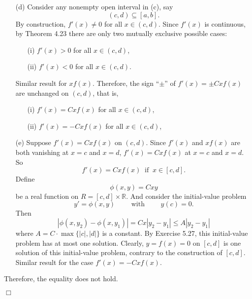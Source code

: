 \documentclass{article}
\begin{document}
\begin{enumerate}
\begin{enumerate}
  \item[(d)]
    Consider any nonempty open interval in (c), say
    \[
      (c,d) \subseteq [a,b].
    \]
    By construction, $f'(x) \neq 0$ for all $x \in (c,d)$.
    Since $f'(x)$ is continuous, by Theorem 4.23
    there are only two mutually exclusive possible cases:
    \begin{enumerate}
      \item[(i)]
      $f'(x) > 0$ for all $x \in (c,d)$,

      \item[(ii)]
      $f'(x) < 0$ for all $x \in (c,d)$.
    \end{enumerate}
    Similar result for $xf(x)$.
    Therefore, the sign ``$\pm$'' of $f'(x) = \pm C x f(x)$ are unchanged on $(c,d)$,
    that is,
    \begin{enumerate}
      \item[(i)]
      $f'(x) = C x f(x)$ for all $x \in (c,d)$,

      \item[(ii)]
      $f'(x) = -C x f(x)$ for all $x \in (c,d)$,
    \end{enumerate}

  \item[(e)]
    Suppose $f'(x) = C xf(x)$ on $(c,d)$.
    Since $f'(x)$ and $xf(x)$ are both vanishing at $x = c$ and $x = d$,
    $f'(x) = C xf(x)$ at $x = c$ and $x = d$.
    So
    \[
      f'(x) = C xf(x) \:\text{ if }\: x \in [c,d].
    \]
    Define
    \[
      \phi(x,y) = Cxy
    \]
    be a real function on $R = [c,d] \times \mathbb{R}$.
    And consider the initial-value problem
    \[
      y' = \phi(x,y)
      \qquad
      \text{ with }
      \qquad
      y(c) = 0.
    \]
    Then
    \[
      |\phi(x,y_2) - \phi(x,y_1)|
      = Cx|y_2-y_1|
      \leq A|y_2-y_1|
    \]
    where $A = C \cdot \max\{|c|,|d|\}$ is a constant.
    By Exercise 5.27, this initial-value problem has at most one solution.
    Clearly, $y = f(x) = 0$ on $[c,d]$ is one solution of this initial-value problem,
    contrary to the construction of $[c,d]$.
    Similar result for the case $f'(x) = -C xf(x)$.
  \end{enumerate}
  Therefore, the equality does not hold.
\end{enumerate}
$\Box$ \\\\



\end{document}

